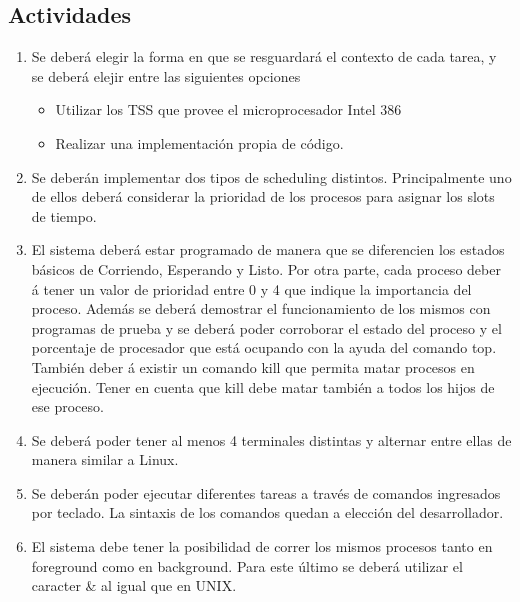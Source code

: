 \documentclass[10pt,a4paper]{article}
\begin{document}
	\subsection{Actividades}
		\begin{enumerate}	
			\item Se deber\'a elegir la forma en que se resguardar\'a el contexto de cada tarea, y se deber\'a elejir entre las siguientes opciones
			\begin{itemize}
				\item Utilizar los TSS que provee el microprocesador Intel 386 
				\item Realizar una implementaci\'on propia de c\'odigo.
			\end{itemize}

			\item Se deber\'an implementar dos tipos de scheduling distintos. Principalmente uno de ellos deber\'a considerar la prioridad de los procesos para asignar los slots de tiempo.

			\item El sistema deber\'a estar programado de manera que se diferencien los estados b\'asicos de Corriendo, Esperando y Listo. Por otra parte, cada proceso deber \'a tener un valor de prioridad entre 0 y 4 que indique la importancia del proceso. Adem\'as se deber\'a demostrar el funcionamiento de los mismos con programas de prueba y se deber\'a poder corroborar el estado del proceso y el porcentaje de procesador que est\'a ocupando con la ayuda del comando top. Tambi\'en deber \'a existir un comando kill que permita matar procesos en ejecuci\'on. Tener en cuenta que kill debe matar tambi\'en a todos los hijos de ese proceso.

			\item Se deber\'a poder tener al menos 4 terminales distintas y alternar entre ellas de manera similar a Linux.

			\item Se deber\'an poder ejecutar diferentes tareas a trav\'es de comandos ingresados por teclado. La sintaxis de los comandos quedan a elecci\'on del desarrollador.

			\item El sistema debe tener la posibilidad de correr los mismos procesos tanto en foreground como en background. Para este \'ultimo se deber\'a utilizar el caracter \& al igual que en UNIX.


\end{enumerate}
\end{document}
